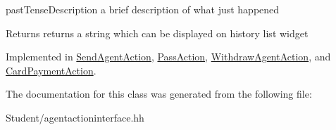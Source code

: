 past\-Tense\-Description a brief description of what just happened 

\begin{DoxyReturn}{Returns}
returns a string which can be displayed on history list widget 
\end{DoxyReturn}


Implemented in \hyperlink{class_send_agent_action_a80cfcff4f904152b3aa1a3f16ecb9f24}{Send\-Agent\-Action}, \hyperlink{class_pass_action_a88d891a53fc296646e4455abe997a6c8}{Pass\-Action}, \hyperlink{class_withdraw_agent_action_a62491bc88210e3100d289e9b04cf2798}{Withdraw\-Agent\-Action}, and \hyperlink{class_card_payment_action_a1ef5f7ef2034bc123de43107c70928ec}{Card\-Payment\-Action}.



The documentation for this class was generated from the following file\-:\begin{DoxyCompactItemize}
\item 
Student/agentactioninterface.\-hh\end{DoxyCompactItemize}
